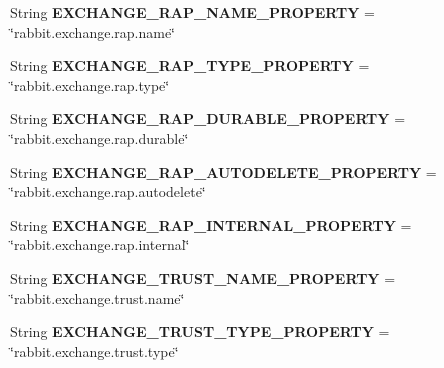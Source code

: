 \begin{DoxyCompactItemize}
String {\bfseries E\+X\+C\+H\+A\+N\+G\+E\+\_\+\+R\+A\+P\+\_\+\+N\+A\+M\+E\+\_\+\+P\+R\+O\+P\+E\+R\+TY} = \char`\"{}rabbit.\+exchange.\+rap.\+name\char`\"{}
\item 
\mbox{\label{interfaceeu_1_1h2020_1_1symbiote_1_1util_1_1RabbitConstants_ab9fbe055ef6f413847c836ac1ad4baec}} 
String {\bfseries E\+X\+C\+H\+A\+N\+G\+E\+\_\+\+R\+A\+P\+\_\+\+T\+Y\+P\+E\+\_\+\+P\+R\+O\+P\+E\+R\+TY} = \char`\"{}rabbit.\+exchange.\+rap.\+type\char`\"{}
\item 
\mbox{\label{interfaceeu_1_1h2020_1_1symbiote_1_1util_1_1RabbitConstants_a03536ef4415738ae09158ec60c8a29ac}} 
String {\bfseries E\+X\+C\+H\+A\+N\+G\+E\+\_\+\+R\+A\+P\+\_\+\+D\+U\+R\+A\+B\+L\+E\+\_\+\+P\+R\+O\+P\+E\+R\+TY} = \char`\"{}rabbit.\+exchange.\+rap.\+durable\char`\"{}
\item 
\mbox{\label{interfaceeu_1_1h2020_1_1symbiote_1_1util_1_1RabbitConstants_a472a742a334647646af3f97c1c597ea4}} 
String {\bfseries E\+X\+C\+H\+A\+N\+G\+E\+\_\+\+R\+A\+P\+\_\+\+A\+U\+T\+O\+D\+E\+L\+E\+T\+E\+\_\+\+P\+R\+O\+P\+E\+R\+TY} = \char`\"{}rabbit.\+exchange.\+rap.\+autodelete\char`\"{}
\item 
\mbox{\label{interfaceeu_1_1h2020_1_1symbiote_1_1util_1_1RabbitConstants_a396eb4d28bef00af5a497816f00e467c}} 
String {\bfseries E\+X\+C\+H\+A\+N\+G\+E\+\_\+\+R\+A\+P\+\_\+\+I\+N\+T\+E\+R\+N\+A\+L\+\_\+\+P\+R\+O\+P\+E\+R\+TY} = \char`\"{}rabbit.\+exchange.\+rap.\+internal\char`\"{}
\item 
\mbox{\label{interfaceeu_1_1h2020_1_1symbiote_1_1util_1_1RabbitConstants_aad693dae74c3086f89701ce8f2579079}} 
String {\bfseries E\+X\+C\+H\+A\+N\+G\+E\+\_\+\+T\+R\+U\+S\+T\+\_\+\+N\+A\+M\+E\+\_\+\+P\+R\+O\+P\+E\+R\+TY} = \char`\"{}rabbit.\+exchange.\+trust.\+name\char`\"{}
\item 
\mbox{\label{interfaceeu_1_1h2020_1_1symbiote_1_1util_1_1RabbitConstants_a1022dc0e343ffccb8192e609047219a6}} 
String {\bfseries E\+X\+C\+H\+A\+N\+G\+E\+\_\+\+T\+R\+U\+S\+T\+\_\+\+T\+Y\+P\+E\+\_\+\+P\+R\+O\+P\+E\+R\+TY} = \char`\"{}rabbit.\+exchange.\+trust.\+type\char`\"{}

\end{DoxyCompactItemize}
